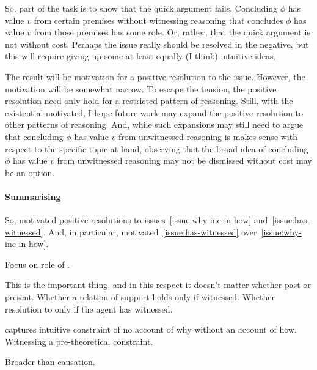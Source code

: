 \begin{note}
  So, part of the task is to show that the quick argument fails.
  Concluding \(\phi\) has value \(v\) from certain premises without witnessing reasoning that concludes \(\phi\) has value \(v\) from those premises has some role.
  Or, rather, that the quick argument is not without cost.
  Perhaps the issue really should be resolved in the negative, but this will require giving up some at least equally (I think) intuitive ideas.

  The result will be motivation for a positive resolution to the issue.
  However, the motivation will be somewhat narrow.
  To escape the tension, the positive resolution need only hold for a restricted pattern of reasoning.
  Still, with the existential motivated, I hope future work may expand the positive resolution to other patterns of reasoning.
  And, while such expansions may still need to argue that concluding \(\phi\) has value \(v\) from unwitnessed reasoning is makes sense with respect to the specific topic at hand, observing that the broad idea of concluding \(\phi\) has value \(v\) from unwitnessed reasoning may not be dismissed without cost may be an option.
\end{note}

\paragraph*{Summarising}

\begin{note}
  So, motivated positive resolutions to issues~\ref{issue:why-inc-in-how} and~\ref{issue:has-witnessed}.
  And, in particular, motivated~\autoref{issue:has-witnessed} over~\autoref{issue:why-inc-in-how}.
\end{note}

\begin{note}
  Focus on role of \iWitness{}.

  \begin{quote}
    \ideaWitnessing*
  \end{quote}

  This is the important thing, and in this respect it doesn't matter whether past or present.
  Whether a relation of support holds only if witnessed.
  Whether resolution to \qWhy{} only if the agent has witnessed.
\end{note}

\begin{note}
  \iWitness{} captures intuitive constraint of no account of why without an account of how.
  Witnessing a pre-theoretical constraint.

  Broader than causation.
\end{note}

